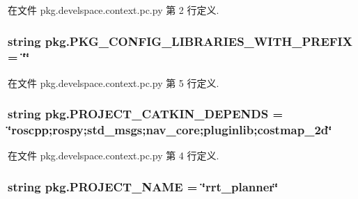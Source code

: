 在文件 pkg.\-develspace.\-context.\-pc.\-py 第 2 行定义.

\hypertarget{namespacepkg_a433e30cecb4a0123a7c4b384d168e336}{
\subsubsection[{P\-K\-G\-\_\-\-C\-O\-N\-F\-I\-G\-\_\-\-L\-I\-B\-R\-A\-R\-I\-E\-S\-\_\-\-W\-I\-T\-H\-\_\-\-P\-R\-E\-F\-I\-X}]{\setlength{\rightskip}{0pt plus 5cm}string pkg.\-P\-K\-G\-\_\-\-C\-O\-N\-F\-I\-G\-\_\-\-L\-I\-B\-R\-A\-R\-I\-E\-S\-\_\-\-W\-I\-T\-H\-\_\-\-P\-R\-E\-F\-I\-X = \char`\"{}\char`\"{}}}\label{namespacepkg_a433e30cecb4a0123a7c4b384d168e336}


在文件 pkg.\-develspace.\-context.\-pc.\-py 第 5 行定义.

\hypertarget{namespacepkg_a17c18447fad253ee1c0d76deec88028c}{
\subsubsection[{P\-R\-O\-J\-E\-C\-T\-\_\-\-C\-A\-T\-K\-I\-N\-\_\-\-D\-E\-P\-E\-N\-D\-S}]{\setlength{\rightskip}{0pt plus 5cm}string pkg.\-P\-R\-O\-J\-E\-C\-T\-\_\-\-C\-A\-T\-K\-I\-N\-\_\-\-D\-E\-P\-E\-N\-D\-S = \char`\"{}roscpp;rospy;std\-\_\-msgs;nav\-\_\-core;pluginlib;costmap\-\_\-2d\char`\"{}}}\label{namespacepkg_a17c18447fad253ee1c0d76deec88028c}


在文件 pkg.\-develspace.\-context.\-pc.\-py 第 4 行定义.

\hypertarget{namespacepkg_a7dfbe99257c26f5e4a3a5483995d9ddc}{
\subsubsection[{P\-R\-O\-J\-E\-C\-T\-\_\-\-N\-A\-M\-E}]{\setlength{\rightskip}{0pt plus 5cm}string pkg.\-P\-R\-O\-J\-E\-C\-T\-\_\-\-N\-A\-M\-E = \char`\"{}rrt\-\_\-planner\char`\"{}}}\label{namespacepkg_a7dfbe99257c26f5e4a3a5483995d9ddc}


